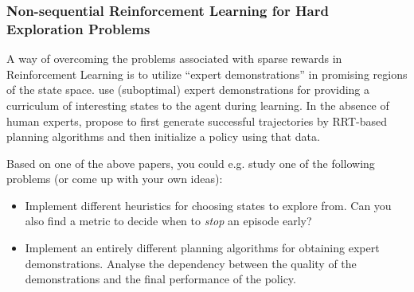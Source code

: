 \documentclass[a4paper]{article}
\begin{document}


\subsubsection{Non-sequential Reinforcement Learning for Hard Exploration Problems}
A way of overcoming the problems associated with sparse rewards in Reinforcement Learning is to utilize ``expert demonstrations'' in promising regions of the state space.
\citet{bauza2024demostart} use (suboptimal) expert demonstrations for providing a curriculum of interesting states to the agent during learning.
In the absence of human experts, \citet{blau2021learning} propose to first generate successful trajectories by RRT-based planning algorithms and then initialize a policy using that data. 

Based on one of the above papers, you could e.g. study one of the following problems (or come up with your own ideas):
\begin{itemize}
  \item Implement different heuristics for choosing states to explore from. Can you also find a metric to decide when to \textit{stop} an episode early?
  \item Implement an entirely different planning algorithms for obtaining expert demonstrations. Analyse the dependency between the quality of the demonstrations and the final performance of the policy.
\end{itemize}
\end{document}
